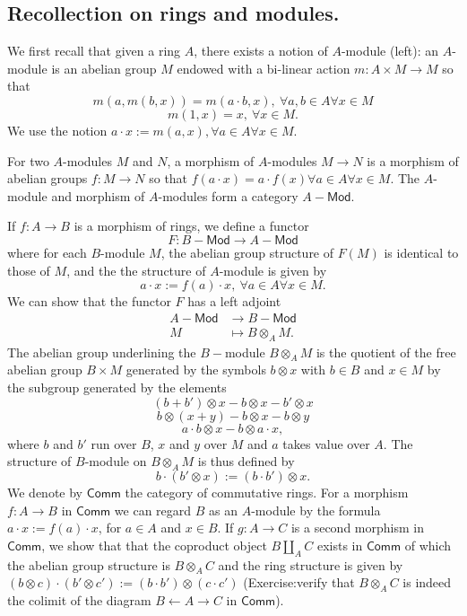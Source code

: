 \documentclass{tufte-book} %
\numberwithin{dummy}{section}
\newcommand{\llta}{\longleftarrow}
\newcommand{\lrta}{\longrightarrow}
\begin{document}
\subsection{Recollection on rings and modules.}
We first recall that given a ring $A$, there exists  a notion of $A$-module (left): an $A$-module is an abelian group $M$ endowed with a bi-linear action $m:A\times M\lrta M$ so that 
$$
m(a,m(b,x))=m(a\cdot b,x),\ \forall a,b\in A\forall x\in M
$$
$$
m(1,x)=x,\ \forall x\in M.
$$
We use the notion $a\cdot x:=m(a,x),\forall a\in A\forall x\in M$.

For two $A$-modules  $M$ and $N$, a morphism of $A$-modules $M\lrta N$ is a morphism of abelian groups $f:M\lrta N$ so that $f(a\cdot x)=a\cdot f(x)\forall a\in A\forall x\in M$. The $A$-module and morphism of $A$-modules form a category $A-\mathsf{Mod}$.

If $f:A\lrta B$ is a morphism of rings, we define a functor
$$
F:B-\mathsf{Mod}\lrta A-\mathsf{Mod}
$$
where for each $B$-module $M$, the abelian group structure of $F(M)$ is identical to those of $M$, and the the structure of $A$-module is given by 
$$
a\cdot x:=f(a)\cdot x, \ \forall a\in A\forall x\in M.
$$
We can show that the functor $F$ has a left adjoint
$$
\begin{aligned}
A-\mathsf{Mod}&\lrta B-\mathsf{Mod}\\
M&\longmapsto B\otimes_A M.
\end{aligned}
$$
The abelian group underlining the $B-$module $B\otimes_A M$ is the quotient of the free abelian group $B\times M$ generated by the symbols $b\otimes x$ with $b\in B$ and $x\in M$ by the subgroup generated by the elements
$$
(b+b')\otimes x-b\otimes x-b'\otimes x
$$
$$
b\otimes(x+y)-b\otimes x-b\otimes y
$$
$$
a\cdot b\otimes x-b\otimes a\cdot x,
$$
where $b$ and $b'$ run over $B$, $x$ and $y$ over $M$ and $a$ takes value over $A$. The structure of $B$-module on $B\otimes_A M$ is thus defined by 
$$
b\cdot(b'\otimes x):=(b\cdot b')\otimes x.
$$
We denote by $\mathsf{Comm}$ the category of commutative rings. For a morphism $f:A\lrta B$ in $\mathsf{Comm}$ we can regard $B$ as an $A$-module by  the formula $a\cdot x:=f(a)\cdot x$, for $a\in A$ and $x\in B$. If $g:A\lrta C$ is a second morphism in $\mathsf{Comm}$, we show that that the coproduct object $B\coprod_A C$ exists in $\mathsf{Comm}$ of which the abelian group structure is $B\otimes_A C$ and the ring structure is given by $(b\otimes c)\cdot (b'\otimes c'):=(b\cdot b')\otimes (c\cdot c')$ (Exercise\sidenote{}:verify that $B\otimes_A C$ is indeed the colimit of the diagram $B\llta A\lrta C$ in $\mathsf{Comm}$).
\end{document}
